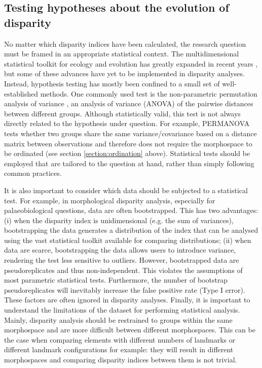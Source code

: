 \documentclass[12pt,letterpaper]{article}
\begin{document}
\subsection{Testing hypotheses about the evolution of disparity} \label{section:testing}

No matter which disparity indices have been calculated, the research question must be framed in an appropriate statistical context.
The multidimensional statistical toolkit for ecology and evolution has greatly expanded in recent years \citep{clavel2015mvmorph, Adams2018}, but some of these advances have yet to be implemented in disparity analyses. Instead, hypothesis testing has mostly been confined to a small set of well-established methods.
One commonly used test is the non-parametric permutation analysis of variance \citep{Anderson2001}, an analysis of variance (ANOVA) of the pairwise distances between different groups.
Although statistically valid, this test is not always directly related to the hypothesis under question.
For example, PERMANOVA tests whether two groups share the same variance/covariance based on a distance matrix between observations and therefore does not require the morphospace to be ordinated (see section \ref{section:ordination} above).
Statistical tests should be employed that are tailored to the question at hand, rather than simply following common practices.

It is also important to consider which data should be subjected to a statistical test.
For example, in morphological disparity analysis, especially for palaeobiological questions, data are often bootstrapped.
This has two advantages: (i) when the disparity index is unidimensional (e.g. the sum of variances), bootstrapping the data generates a distribution of the index that can be analysed using the vast statistical toolkit available for comparing distributions; (ii) when data are scarce, bootstrapping the data allows users to introduce variance, rendering the test less sensitive to outliers.
However, bootstrapped data are pseudoreplicates and thus non-independent.
This violates the assumptions of most parametric statistical tests.
Furthermore, the number of bootstrap pseudoreplicates will inevitably increase the false positive rate (Type I error).
These factors are often ignored in disparity analyses.
Finally, it is important to understand the limitations of the dataset for performing statistical analysis.
Mainly, disparity analysis should be restrained to groups within the same morphospace and are more difficult between different morphospaces.
This can be the case when comparing elements with different numbers of landmarks or different landmark configurations for example: they will result in different morphospaces and comparing disparity indices between them is not trivial.
\end{document}

